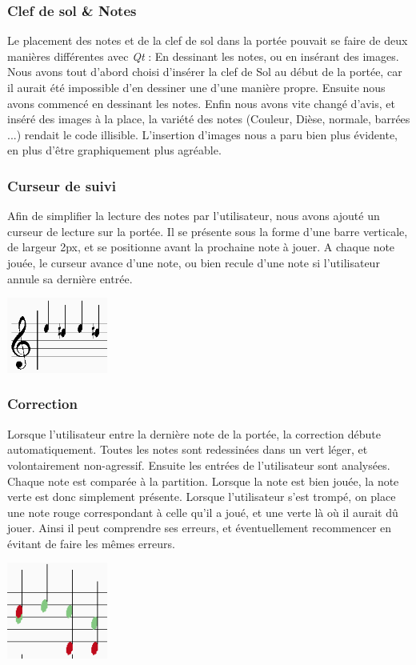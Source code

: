 \documentclass{article}
\begin{document}
\subsubsection{Clef de sol \& Notes}
Le placement des notes et de la clef de sol dans la portée pouvait se faire de deux manières différentes avec \emph{Qt} : En dessinant les notes, ou en insérant des images. Nous avons tout d'abord choisi d'insérer la clef de Sol au début de la portée, car il aurait été impossible d'en dessiner une d'une manière propre. Ensuite nous avons commencé en dessinant les notes. Enfin nous avons vite changé d'avis, et inséré des images à la place, la variété des notes (Couleur, Dièse, normale, barrées ...) rendait le code illisible. L'insertion d'images nous a paru bien plus évidente, en plus d'être graphiquement plus agréable. 
\subsubsection{Curseur de suivi}
Afin de simplifier la lecture des notes par l'utilisateur, nous avons ajouté un curseur de lecture sur la portée. Il se présente sous la forme d'une barre verticale, de largeur 2px, et se positionne avant la prochaine note à jouer. A chaque note jouée, le curseur avance d'une note, ou bien recule d'une note si l'utilisateur annule sa dernière entrée. 
\begin{center}
\includegraphics[width = 125px]{./images/scroller.png}
\end{center}
\subsubsection{Correction}
Lorsque l'utilisateur entre la dernière note de la portée, la correction débute automatiquement. Toutes les notes sont redessinées dans un vert léger, et volontairement non-agressif. Ensuite les entrées de l'utilisateur sont analysées. Chaque note est comparée à la partition. Lorsque la note est bien jouée, la note verte est donc simplement présente. Lorsque l'utilisateur s'est trompé, on place une note rouge correspondant à celle qu'il a joué, et une verte là où il aurait dû jouer. Ainsi il peut comprendre ses erreurs, et éventuellement recommencer en évitant de faire les mêmes erreurs. 
\begin{center}
\includegraphics[width = 125px]{./images/correct.png}
\end{center}
\end{document}

